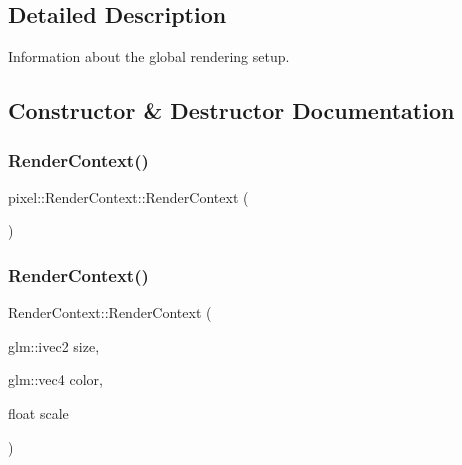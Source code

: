 \subsection{Detailed Description}
Information about the global rendering setup. 

\subsection{Constructor \& Destructor Documentation}
\mbox{\label{structpixel_1_1_render_context_ae08ab393a489732b6a0c38fa50adae56}} 
\subsubsection{\texorpdfstring{Render\+Context()}{RenderContext()}\hspace{0.1cm}{\footnotesize\ttfamily [1/2]}}
{\footnotesize\ttfamily pixel\+::\+Render\+Context\+::\+Render\+Context (\begin{DoxyParamCaption}{ }\end{DoxyParamCaption})\hspace{0.3cm}{\ttfamily [default]}}

\mbox{\label{structpixel_1_1_render_context_a8444032f302469f5fb925b9b6e2078c3}} 
\subsubsection{\texorpdfstring{Render\+Context()}{RenderContext()}\hspace{0.1cm}{\footnotesize\ttfamily [2/2]}}
{\footnotesize\ttfamily Render\+Context\+::\+Render\+Context (\begin{DoxyParamCaption}\item[{glm\+::ivec2}]{size,  }\item[{glm\+::vec4}]{color,  }\item[{float}]{scale }\end{DoxyParamCaption})}



